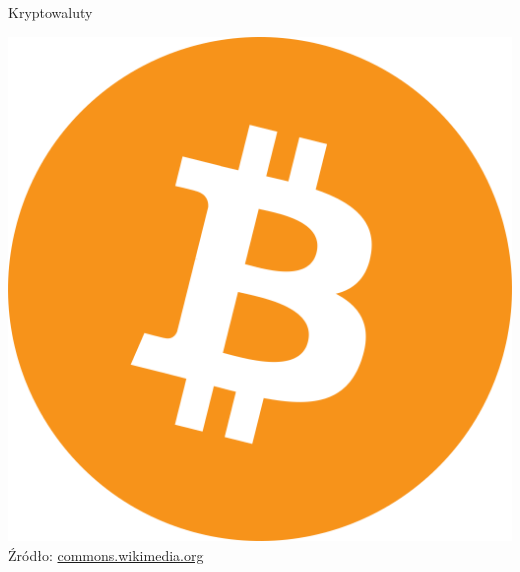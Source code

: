 \subsection{}
\begin{frame}{Kryptowaluty}
    \begin{center}
        \begin{minipage}{0.24\textwidth}
            \centering
            \includegraphics[width=\linewidth]{applications/graphics/Bitcoin.png} \\
            \tiny{Źródło: \href{https://commons.wikimedia.org/wiki/File:Bitcoin_logo.svg}{commons.wikimedia.org}}
        \end{minipage}
        \hfill
        \begin{minipage}{0.24\textwidth}
            \centering

\end{minipage}
\end{center}
\end{frame}
